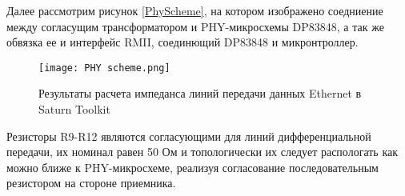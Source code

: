 Далее рассмотрим рисунок \ref{PhyScheme}, на котором изображено соедниение между согласущим трансформатором 
и PHY-микросхемы DP83848, а так же обвязка ее и интерфейс RMII, соединющий DP83848 и микронтроллер. 

\begin{figure}[H]
\centering
\texttt{[image: PHY scheme.png]}
\caption{Результаты расчета импеданса линий передачи данных Ethernet в Saturn Toolkit}
\label{ris:Saturn}
\end{figure}

Резисторы R9-R12 являются согласующими для линий дифференциальной передачи, их номинал равен 50 Ом и топологически 
их следует распологать как можно ближе к PHY-микросхеме, реализуя согласование последовательным резистором на 
стороне приемника. 

